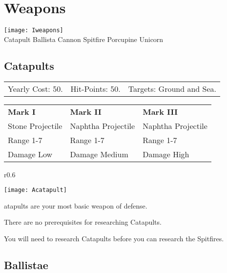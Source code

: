 \clearpage

\section{Weapons}


\begin{center}
	\texttt{[image: Iweapons]} %
	\\ Catapult Ballista Cannon Spitfire Porcupine Unicorn
\end{center}

\subsection{Catapults}


\begin{tabular}{p{1.264in} p{1.264in} p{1.264in}}
Yearly Cost: 50. & Hit-Points: 50. & Targets: Ground and Sea.
\end{tabular}

\begin{tabular}{|p{1.264in} p{1.264in} p{1.264in}|}
	\hline
	\textbf{Mark I}	& \textbf{Mark II} & \textbf{Mark III} \\
	Stone Projectile & Naphtha Projectile & Naphtha Projectile \\
	Range 1-7 & Range 1-7& Range 1-7 \\
	Damage Low & Damage Medium & Damage High \\
	\hline
\end{tabular}

\begin{wrapfigure}{r}{0.6\textwidth}
	\vspace{-20pt}
	\begin{center}
		\texttt{[image: Acatapult]} %
	\end{center}
	\vspace{-20pt}
\end{wrapfigure}

atapults are your most basic weapon of defense. 

There are no prerequisites for researching Catapults. 

You will need to research Catapults before you can research the Spitfires.

\clearpage

\subsection{Ballistae}

